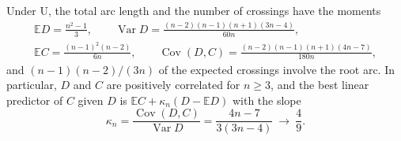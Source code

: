\documentclass[mathematics,article,submit,pdftex,oneauthor]{Definitions/mdpi}
\newcommand{\E}{\mathbb E}
\newcommand{\Var}{\operatorname{Var}}
\newcommand{\Cov}{\operatorname{Cov}}
\begin{document}
\begin{Proposition}\label{prop:total}
Under U, the total arc length and the number of crossings have the moments
\begin{gather}
\E D=\frac{n^2-1}{3},\qquad \Var D=\frac{(n-2)(n-1)(n+1)(3n-4)}{60n},\label{eq:totalU}\\
\E C=\frac{(n-1)^2(n-2)}{6n},\qquad \Cov(D,C)=\frac{(n-2)(n-1)(n+1)(4n-7)}{180n},\label{eq:crossU}
\end{gather}
and $(n-1)(n-2)/(3n)$ of the expected crossings involve the root arc.
In particular, $D$ and $C$ are positively correlated for $n\geqslant3$, and the best linear predictor of $C$ given $D$ is $\E C+\kappa_n(D-\E D)$ with the slope
\begin{equation}\label{eq:slope}
\kappa_n=\frac{\Cov(D,C)}{\Var D}=\frac{4n-7}{3(3n-4)}\ \longrightarrow\ \frac49.
\end{equation}
\end{Proposition}
\end{document}
